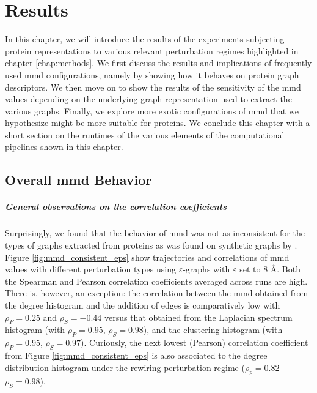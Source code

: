 \chapter{Results}\label{chap:results}

In this chapter, we will introduce the results of the experiments subjecting
protein representations to various relevant perturbation regimes highlighted in
chapter \ref{chap:methods}. We first discuss the results and implications of
frequently used \acrshort{mmd} configurations, namely by showing how it behaves
on protein graph descriptors. We then move on to show the results of the
sensitivity of the \acrshort{mmd} values depending on the underlying graph
representation used to extract the various graphs. Finally, we explore more
exotic configurations of \acrshort{mmd} that we hypothesize might be more
suitable for proteins. We conclude this chapter with a short section on the
runtimes of the various elements of the computational pipelines shown in this
chapter.

\section{Overall \acrshort{mmd} Behavior}

\paragraph{General observations on the correlation coefficients} Surprisingly,
we found that the behavior of \acrshort{mmd} was not as inconsistent for the
types of graphs extracted from proteins as was found on synthetic graphs by
\cite{obray2022evaluation}. Figure \ref{fig:mmd_consistent_eps} show
trajectories and correlations of \acrshort{mmd} values with different
perturbation types using $\varepsilon$-graphs with $\varepsilon$ set to $8$
\si{\angstrom}. Both the Spearman and Pearson correlation coefficients averaged
across runs are high. There is, however, an exception: the correlation between
the \acrshort{mmd} obtained from the degree histogram and the addition of edges
is comparatively low with $\rho_P=0.25$ and $\rho_S=-0.44$ versus that obtained
from the Laplacian spectrum histogram (with $\rho_P=0.95$, $\rho_S=0.98$), and
the clustering histogram (with $\rho_P=0.95$, $\rho_S=0.97$). Curiously, the
next lowest (Pearson) correlation coefficient from Figure
\ref{fig:mmd_consistent_eps} is also associated to the degree distribution
histogram under the rewiring perturbation regime ($\rho_p=0.82$ $\rho_S=0.98$).

